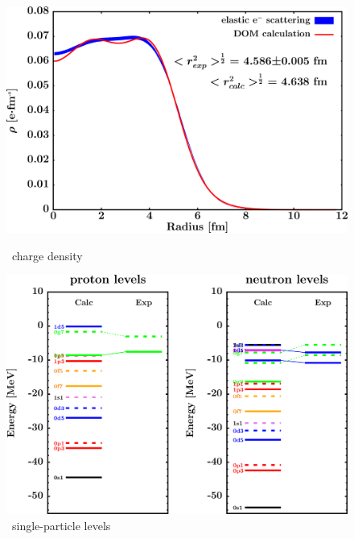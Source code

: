 \begin{figure}[hbtp]
    \centering
    \begin{minipage}{0.42\textwidth}
        \centering
        \includegraphics[width=\textwidth]{figures/sn112_chargeDensity.png}
        \caption*{\snTwelve\ charge density}
        \label{DOMFitData_sn112_chargeDensity}
    \end{minipage}\hspace{6pt}
    \begin{minipage}{0.42\textwidth}
        \centering
        \includegraphics[width=\textwidth]{figures/sn112_SPLevels.png}
        \caption*{\snTwelve\ single-particle levels}
        \label{DOMFitData_sn112_SPLevels}
    \end{minipage}
\end{figure}
